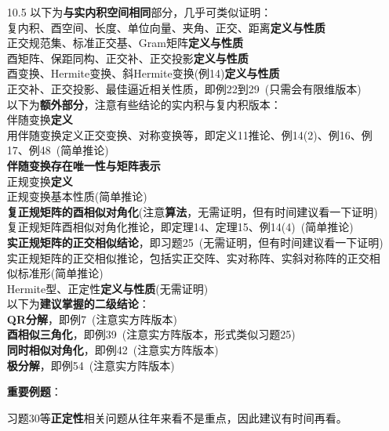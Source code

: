 \documentclass[a4paper,UTF8,fontset=windows,AutoFakeBold]{ctexart}
\newcommand*{\note}{\noindent *}
\begin{document}
\begin{enumerate}
    \item[10.5] \note 以下为\textbf{与实内积空间相同}部分，几乎可类似证明：
    \\复内积、酉空间、长度、单位向量、夹角、正交、距离\textbf{定义与性质}
    \\正交规范集、标准正交基、Gram矩阵\textbf{定义与性质}
    \\酉矩阵、保距同构、正交补、正交投影\textbf{定义与性质}
    \\酉变换、Hermite变换、斜Hermite变换(例14)\textbf{定义与性质}
    \\正交补、正交投影、最佳逼近相关性质，即例22到29\ (只需会有限维版本)
    \\\note 以下为\textbf{额外部分}，注意有些结论的实内积与复内积版本：
    \\伴随变换\textbf{定义}
    \\用伴随变换定义正交变换、对称变换等，即定义11推论、例14(2)、例16、例17、例48\ (简单推论)
    \\\textbf{伴随变换存在唯一性与矩阵表示}
    \\正规变换\textbf{定义}
    \\正规变换基本性质(简单推论)
    \\\textbf{复正规矩阵的酉相似对角化}(注意\textbf{算法}，无需证明，但有时间建议看一下证明)
    \\复正规矩阵酉相似对角化推论，即定理14、定理15、例14(4)\ (简单推论)
    \\\textbf{实正规矩阵的正交相似结论}，即习题25\ (无需证明，但有时间建议看一下证明)
    \\实正规矩阵的正交相似推论，包括实正交阵、实对称阵、实斜对称阵的正交相似标准形(简单推论)
    \\Hermite型、正定性\textbf{定义与性质}(无需证明)
    \\\note 以下为\textbf{建议掌握的二级结论}：
    \\\textbf{QR分解}，即例7\ (注意实方阵版本)
    \\\textbf{酉相似三角化}，即例39\ (注意实方阵版本，形式类似习题25)
    \\\textbf{同时相似对角化}，即例42\ (注意实方阵版本)
    \\\textbf{极分解}，即例54\ (注意实方阵版本)

    \textbf{重要例题}：
    \note 习题30等\textbf{正定性}相关问题从往年来看不是重点，因此建议有时间再看。
\end{enumerate}
\end{document}

